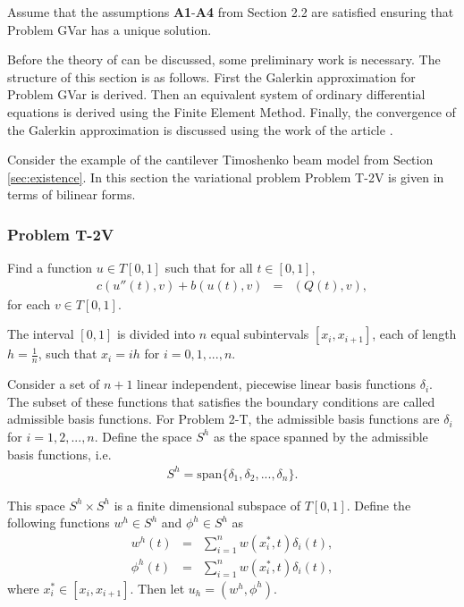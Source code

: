 \documentclass[../../main.tex]{subfiles}
\begin{document}
Assume that the assumptions \textbf{A1}-\textbf{A4} from Section 2.2 are
satisfied ensuring that Problem GVar has a unique solution.

Before the theory of \cite{BV13} can be discussed, some preliminary work is
necessary. The structure of this section is as follows. First the Galerkin
approximation for Problem GVar is derived. Then an equivalent system of
ordinary differential equations is derived using the Finite Element Method.
Finally, the convergence of the Galerkin approximation is discussed using the
work of the article \cite{BV13}.

Consider the example of the cantilever Timoshenko beam model from Section \ref{sec:existence}. In this section the variational problem Problem T-2V is given in terms of bilinear forms.

\subsubsection{Problem T-2V}
Find a function $u \in T[0,1]$ such that for all $t \in [0,1]$,
\begin{eqnarray*}
	c(u''(t),v) + b(u(t),v) & = & (Q(t),v),
\end{eqnarray*} for each $v \in T[0,1]$.

The interval $[0,1]$ is divided into $n$ equal subintervals $[x_{i}, x_{i+1}]$, each of length $\displaystyle h = \frac{1}{n}$, such that $x_i = ih$ for $i = 0,1,...,n$.

Consider a set of $n+1$ linear independent, piecewise linear basis functions $\delta_i$. The subset of these functions that satisfies the boundary conditions are called admissible basis functions. For Problem 2-T, the admissible basis functions are ${\delta_i}$ for $i = 1,2,...,n$. Define the space $S^h$ as the space spanned by the admissible basis functions, i.e.
\begin{eqnarray*}
	S^h = \textrm{span}\{\delta_1, \delta_2, ..., \delta_n\}.
\end{eqnarray*} \label{sym:span}

This space $S^h\times S^h$ is a finite dimensional subspace of $T[0,1]$. Define the following functions $w^h \in S^h$ and $\phi^h \in S^h$ as
\begin{eqnarray*}
	w^h(t) & = & \sum_{i=1}^{n} w(x_i^*,t) \delta_i(t),\\
	\phi^h(t) & = & \sum_{i=1}^{n} w(x_i^*,t) \delta_i(t),
\end{eqnarray*} where $x^*_i \in [x_i, x_{i+1}]$. Then let $u_h = (w^h, \phi^h )$.
\end{document}
